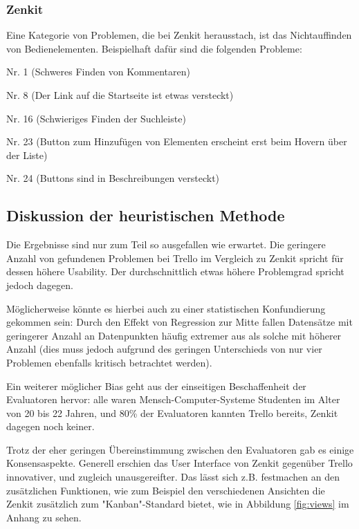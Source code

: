 \subsubsection{Zenkit}
Eine Kategorie von Problemen, die bei Zenkit herausstach, ist das Nichtauffinden von Bedienelementen. Beispielhaft dafür sind die folgenden Probleme: 
\begin{APAitemize}
    \item Nr. 1 (Schweres Finden von Kommentaren)
    \item Nr. 8 (Der Link auf die Startseite ist etwas versteckt)
    \item Nr. 16 (Schwieriges Finden der Suchleiste)
    \item Nr. 23 (Button zum Hinzufügen von Elementen erscheint erst beim Hovern über der Liste)
    \item Nr. 24 (Buttons sind in Beschreibungen versteckt)
\end{APAitemize}{} 


\subsection{Diskussion der heuristischen Methode}
Die Ergebnisse sind nur zum Teil so ausgefallen wie erwartet. Die geringere Anzahl von gefundenen Problemen bei Trello im Vergleich zu Zenkit spricht für dessen höhere Usability. Der durchschnittlich etwas höhere Problemgrad spricht jedoch dagegen. 

Möglicherweise könnte es hierbei auch zu einer statistischen Konfundierung gekommen sein: Durch den Effekt von Regression zur Mitte fallen Datensätze mit geringerer Anzahl an Datenpunkten häufig extremer aus als solche mit höherer Anzahl (dies muss jedoch aufgrund des geringen Unterschieds von nur vier Problemen ebenfalls kritisch betrachtet werden).

Ein weiterer möglicher Bias geht aus der einseitigen Beschaffenheit der Evaluatoren hervor: alle waren Mensch-Computer-Systeme Studenten im Alter von 20 bis 22 Jahren, und 80\% der Evaluatoren kannten Trello bereits, Zenkit dagegen noch keiner.

Trotz der eher geringen Übereinstimmung zwischen den Evaluatoren gab es einige Konsensaspekte. Generell erschien das User Interface von Zenkit gegenüber Trello innovativer, und zugleich unausgereifter. 
Das lässt sich z.B. festmachen an den zusätzlichen Funktionen, wie zum Beispiel den verschiedenen Ansichten die Zenkit zusätzlich zum "Kanban"-Standard bietet, wie in Abbildung \ref{fig:views} im Anhang zu sehen.


